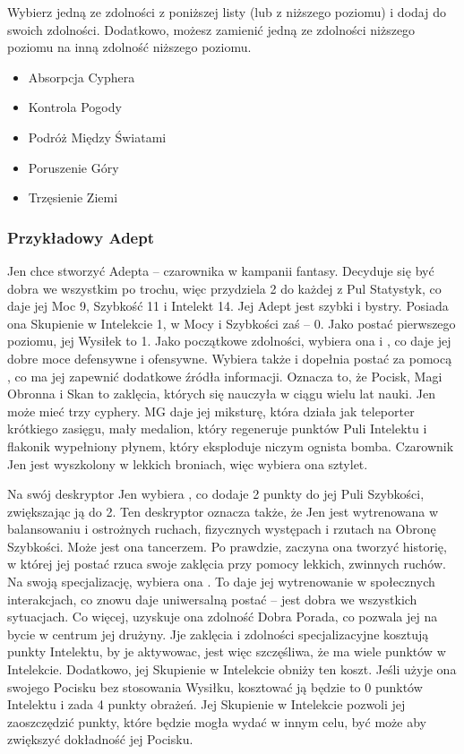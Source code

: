 Wybierz jedną ze zdolności z poniższej listy (lub z niższego poziomu) i dodaj do swoich zdolności. Dodatkowo, możesz zamienić jedną ze zdolności niższego poziomu na inną zdolność niższego poziomu.

\begin{itemize}
\item Absorpcja Cyphera
\item Kontrola Pogody
\item Podróż Między Światami
\item Poruszenie Góry
\item Trzęsienie Ziemi
\end{itemize}

\subsubsection{Przykładowy Adept}

Jen chce stworzyć Adepta – czarownika w kampanii fantasy. Decyduje się być dobra we wszystkim po trochu, więc przydziela 2 do każdej z Pul Statystyk, co daje jej Moc 9, Szybkość 11 i Intelekt 14. Jej Adept jest szybki i bystry. Posiada ona Skupienie w Intelekcie 1, w Mocy i Szybkości zaś – 0. Jako postać pierwszego poziomu, jej Wysiłek to 1. Jako początkowe zdolności, wybiera ona  i , co daje jej dobre moce defensywne i ofensywne. Wybiera także  i dopełnia postać za pomocą , co ma jej zapewnić dodatkowe źródła informacji. Oznacza to, że Pocisk, Magi Obronna i Skan to zaklęcia, których się nauczyła w ciągu wielu lat nauki.
Jen może mieć trzy cyphery. MG daje jej miksturę, która działa jak teleporter krótkiego zasięgu, mały medalion, który regeneruje  punktów Puli Intelektu i flakonik wypełniony płynem, który eksploduje niczym ognista bomba. Czarownik Jen jest wyszkolony w lekkich broniach, więc wybiera ona sztylet.

Na swój deskryptor Jen wybiera , co dodaje 2 punkty do jej Puli Szybkości, zwiększając ją do 2. Ten deskryptor oznacza także, że Jen jest wytrenowana w balansowaniu i ostrożnych ruchach, fizycznych występach i rzutach na Obronę Szybkości. Może jest ona tancerzem. Po prawdzie, zaczyna ona tworzyć historię, w której jej postać rzuca swoje zaklęcia przy pomocy lekkich, zwinnych ruchów.
Na swoją specjalizację, wybiera ona . To daje jej wytrenowanie w społecznych interakcjach, co znowu daje uniwersalną postać – jest dobra we wszystkich sytuacjach. Co więcej, uzyskuje ona zdolność Dobra Porada, co pozwala jej na bycie w centrum jej drużyny.
Jje zaklęcia i zdolności specjalizacyjne kosztują punkty Intelektu, by je aktywowac, jest więc szczęśliwa, że ma wiele punktów w Intelekcie. Dodatkowo, jej Skupienie w Intelekcie obniży ten koszt. Jeśli użyje ona swojego Pocisku bez stosowania Wysiłku, kosztować ją będzie to 0 punktów Intelektu i zada 4 punkty obrażeń. Jej Skupienie w Intelekcie pozwoli jej zaoszczędzić punkty, które będzie mogła wydać w innym celu, być może aby zwiększyć dokładność jej Pocisku.


